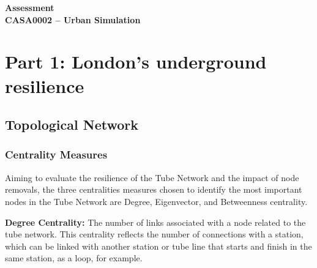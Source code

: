 \documentclass[10pt]{report}
\author{Felipe Santos Almeida}
\numberwithin{figure}{section}
\numberwithin{table}{section}
\begin{document}

\begin{center}
    \vspace*{-3cm}
\end{center}   
    {\LARGE\textbf{Assessment\\
    CASA0002 – Urban Simulation\\}}
    

\section{Part 1: London’s underground resilience}


 \subsection{Topological Network}
\subsubsection{Centrality Measures } 
        
         Aiming to evaluate the resilience of the Tube Network and the impact of node removals, the three centralities measures chosen to identify the most important nodes in the Tube Network are Degree, Eigenvector, and Betweenness centrality.
        
        \vspace{5mm} %
        
        \textbf{Degree Centrality:} The number of links associated with a node related to the tube network. This centrality reflects the number of connections with a station, which can be linked with another station or tube line that starts and finish in the same station, as a loop, for example. 
\end{document}
